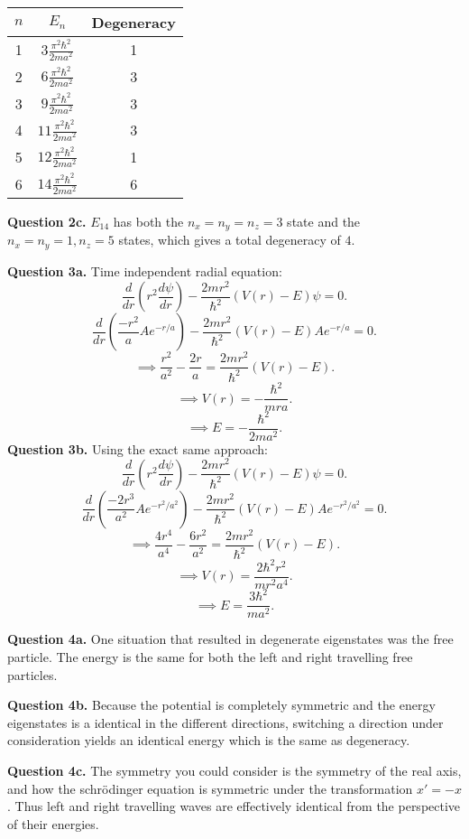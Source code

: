 \documentclass[letterpaper, reqno,11pt]{article}
\begin{document}
\begin{table}[htpb]
    \centering
    \label{tab:2b}
    \begin{tabular}{c|c|c}
        $n$&$E_{n}$&Degeneracy\\
        \hline
        1&$3 \frac{\pi^2 \hbar^2}{2ma^2}$&1\\
        2&$6 \frac{\pi^2 \hbar^2}{2ma^2}$&3\\
        3&$9 \frac{\pi^2 \hbar^2}{2ma^2}$&3\\
        4&$11 \frac{\pi^2 \hbar^2}{2ma^2}$&3\\
        5&$12 \frac{\pi^2 \hbar^2}{2ma^2}$&1\\
        6&$14 \frac{\pi^2 \hbar^2}{2ma^2}$&6
        
    \end{tabular}
\end{table}

{\noindent\bf Question 2c.} $E_{14}$ has both the $n_x=n_y=n_z=3$ state and the $n_x=n_y=1, n_z=5$ states, which gives a total degeneracy of $4$. 

{\noindent\bf Question 3a.} Time independent radial equation: 
\[
\frac{d}{dr}\left( r^2 \frac{d\psi}{dr} \right)-\frac{2mr^2}{\hbar^2}\left( V(r)-E \right) \psi=0
.\]
\[
\frac{d}{dr}\left( \frac{-r^2}{a}Ae^{-r /a} \right)-\frac{2mr^2}{\hbar^2}(V(r)-E)Ae^{-r /a}=0
.\]
\[
\implies \frac{r^2}{a^2}-\frac{2r}{a}=\frac{2mr^2}{\hbar^2}(V(r)-E)
.\]
\[
\implies V(r)=-\frac{\hbar^2}{mra}
.\]
\[
\implies E=-\frac{\hbar^2}{2ma^2}
.\]
{\noindent\bf Question 3b.} Using the exact same approach: 
\[
\frac{d}{dr}\left( r^2 \frac{d\psi}{dr} \right)-\frac{2mr^2}{\hbar^2}\left( V(r)-E \right) \psi=0
.\]
\[
\frac{d}{dr}\left( \frac{-2r^3}{a^2}Ae^{-r^2 /a^2} \right)-\frac{2mr^2}{\hbar^2}(V(r)-E)Ae^{-r^2 /a^2}=0
.\]
\[
\implies \frac{4r^4}{a^4}-\frac{6r^2}{a^2}=\frac{2mr^2}{\hbar^2}(V(r)-E)
.\]
\[
\implies V(r)=\frac{2\hbar^2r^2}{mr^2a^4}
.\]
\[
\implies E=\frac{3\hbar^2}{ma^2}
.\]

{\noindent\bf Question 4a.} One situation that resulted in degenerate eigenstates was the free particle. The energy is the same for both the left and right travelling free particles. 

{\noindent\bf Question 4b.} Because the potential is completely symmetric and the energy eigenstates is a identical in the different directions, switching a direction under consideration yields an identical energy which is the same as degeneracy. 

{\noindent\bf Question 4c.} The symmetry you could consider is the symmetry of the real axis, and how the schr\"odinger equation is symmetric under the transformation $x'=-x$. Thus left and right travelling waves are effectively identical from the perspective of their energies. 
\end{document}

